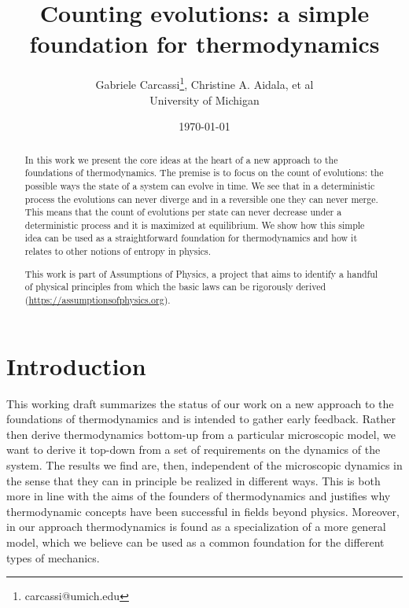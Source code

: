 \documentclass[letterpaper,twocolumn]{article}
\begin{document}
\title{Counting evolutions: a simple foundation for thermodynamics}
\author{Gabriele Carcassi\footnote{carcassi@umich.edu}, Christine A. Aidala, et al \\ University of Michigan}

\date{\today}

\maketitle

\begin{abstract}
	In this work we present the core ideas at the heart of a new approach to the foundations of thermodynamics. The premise is to focus on the count of evolutions: the possible ways the state of a system can evolve in time. We see that in a deterministic process the evolutions can never diverge and in a reversible one they can never merge. This means that the count of evolutions per state can never decrease under a deterministic process and it is maximized at equilibrium. We show how this simple idea can be used as a straightforward foundation for thermodynamics and how it relates to other notions of entropy in physics.
	
	This work is part of Assumptions of Physics, a project that aims to identify a handful of physical principles from which the basic laws can be rigorously derived  (\url{https://assumptionsofphysics.org}).
\end{abstract}


\section{Introduction}

This working draft summarizes the status of our work on a new approach to the foundations of thermodynamics and is intended to gather early feedback. Rather then derive thermodynamics bottom-up from a particular microscopic model, we want to derive it top-down from a set of requirements on the dynamics of the system. The results we find are, then, independent of the microscopic dynamics in the sense that they can in principle be realized in different ways. This is both more in line with the aims of the founders of thermodynamics and justifies why thermodynamic concepts have been successful in fields beyond physics. Moreover, in our approach thermodynamics is found as a specialization of a more general model, which we believe can be used as a common foundation for the different types of mechanics.
\end{document}
